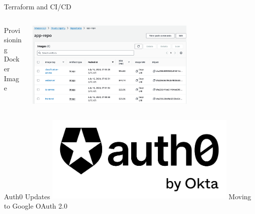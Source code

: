 


\begin{frame}{Terraform and CI/CD}
    \begin{columns}
        \begin{column}{0.5\textwidth}
            Provisioning \\
            Docker Image
        \end{column}
        \begin{column}{0.5\textwidth}
            \includegraphics[height=0.7\textheight,width=0.7\textwidth,keepaspectratio]{images/mm_ecr.png} 
        \end{column}
    \end{columns}
\end{frame}



\begin{frame}{Auth0 Updates}
    \centering
    \includegraphics[height=0.7\textheight,width=0.7\textwidth,keepaspectratio]{images/mm_auth0.png}
    Moving to Google OAuth 2.0
\end{frame}




